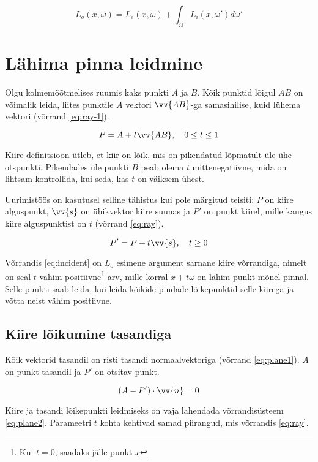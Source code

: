 \documentclass[a4paper,12pt]{report}
\renewcommand{\vec}[1]{\vv{#1}}
\begin{document}
\begin{equation} \label{eq:mc-is2}
L_o(x, \omega) = L_e(x, \omega) + \int_\Omega L_i(x, \omega') d\omega'
\end{equation}

\section{Lähima pinna leidmine}
Olgu kolmemõõtmelises ruumis kaks punkti \(A\) ja \(B\). Kõik punktid
lõigul \(AB\) on võimalik leida, liites punktile \(A\) vektori \(\vec{AB}\)-ga
samasihilise, kuid lühema vektori (võrrand \ref{eq:ray-1}).

\begin{equation} \label{eq:ray-1}
P = A + t\vec{AB}, \quad 0 \leq t \leq 1
\end{equation}

Kiire definitsioon ütleb, et kiir on lõik, mis on pikendatud lõpmatult
üle ühe otspunkti. Pikendades üle punkti \(B\) peab olema \(t\)
mittenegatiivne, mida on lihtsam kontrollida, kui seda, kas \(t\) on
väiksem ühest.

Uurimistöös on kasutusel selline tähistus kui pole märgitud teisiti:
\(P\) on kiire alguspunkt, \(\vec s\) on ühikvektor kiire suunas ja
\(P'\) on punkt kiirel, mille kaugus kiire alguspunktist on \(t\)
(võrrand \ref{eq:ray}).

\begin{equation} \label{eq:ray}
P' = P + t\vec s, \quad t \geq 0
\end{equation}

Võrrandis \ref{eq:incident} on \(L_o\) esimene argument sarnane kiire
võrrandiga, nimelt on seal \(t\) vähim positiivne\footnote{Kui \(t=0\),
saadaks jälle punkt \(x\)} arv, mille korral \(x + t\omega\) on lähim
punkt mõnel pinnal. Selle punkti saab leida, kui leida kõikide pindade
lõikepunktid selle kiirega ja võtta neist vähim positiivne.

\subsection{Kiire lõikumine tasandiga}
Kõik vektorid tasandil on risti tasandi normaalvektoriga (võrrand
\ref{eq:plane1}). \(A\) on punkt tasandil ja \(P'\) on otsitav punkt.

\begin{equation} \label{eq:plane1}
(A - P') \cdot \vec n = 0
\end{equation}

Kiire ja tasandi lõikepunkti leidmiseks on vaja lahendada võrrandisüsteem
\ref{eq:plane2}. Parameetri \(t\) kohta kehtivad samad piirangud, mis
võrrandis \ref{eq:ray}.
\end{document}
